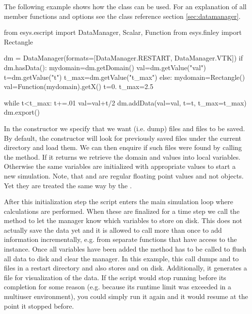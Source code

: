The following example shows how the  class can be used.
For an explanation of all member functions and options see the class reference
section \ref{sec:datamanager}.
\begin{python}
  from esys.escript import DataManager, Scalar, Function
  from esys.finley import Rectangle

  dm = DataManager(formats=[DataManager.RESTART, DataManager.VTK])
  if dm.hasData():
    mydomain=dm.getDomain()
    val=dm.getValue("val")
    t=dm.getValue("t")
    t_max=dm.getValue("t_max")
  else:
    mydomain=Rectangle()
    val=Function(mydomain).getX()
    t=0.
    t_max=2.5

  while t<t_max:
    t+=.01
    val=val+t/2
    dm.addData(val=val, t=t, t_max=t_max)
    dm.export()
\end{python}
In the constructor we specify that we want  (i.e. dump) files
and  files to be saved.
By default, the constructor will look for previously saved 
files under the current directory and load them.
We can then enquire if such files were found by calling the 
method. If it returns \True we retrieve the domain and values into local
variables. Otherwise the same variables are initialized with appropriate
values to start a new simulation.
Note, that  and  are regular floating point values and not
\Data objects. Yet they are treated the same way by the .

After this initialization step the script enters the main simulation loop
where calculations are performed.
When these are finalized for a time step we call the  method
to let the manager know which variables to store on disk.
This does not actually save the data yet and it is allowed to call
 more than once to add information incrementally, e.g. from
separate functions that have access to the  instance.
Once all variables have been added the  method has to be called
to flush all data to disk and clear the manager.
In this example, this call dumps  and  to files
in a restart directory and also stores  and  on disk.
Additionally, it generates a \VTK file for visualization of the data.
If the script would stop running before its completion for some reason (e.g.
because its runtime limit was exceeded in a multiuser environment), you could
simply run it again and it would resume at the point it stopped before.

